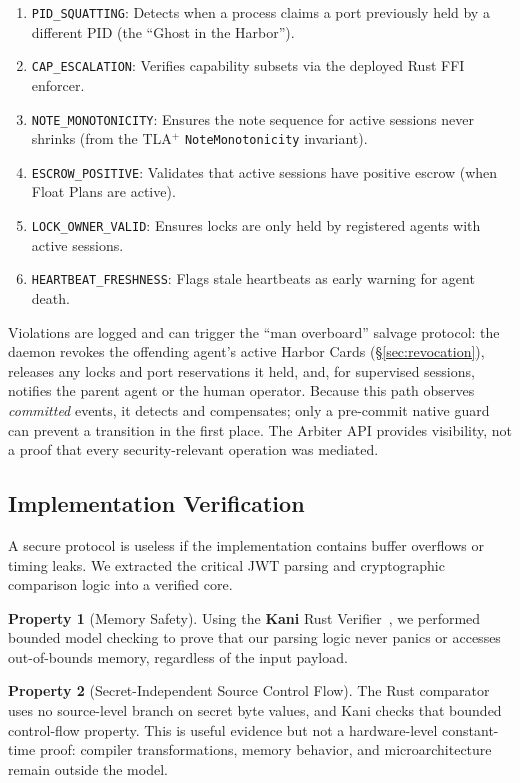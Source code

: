 \documentclass[11pt,a4paper]{article}
\theoremstyle{definition}
\newtheorem{property}{Property}[section]
\begin{document}
\begin{enumerate}
  \item \texttt{PID\_SQUATTING}: Detects when a process claims a port previously held by a different PID (the ``Ghost in the Harbor'').
  \item \texttt{CAP\_ESCALATION}: Verifies capability subsets via the deployed Rust FFI enforcer.
  \item \texttt{NOTE\_MONOTONICITY}: Ensures the note sequence for active sessions never shrinks (from the TLA$^{+}$ \texttt{NoteMonotonicity} invariant).
  \item \texttt{ESCROW\_POSITIVE}: Validates that active sessions have positive escrow (when Float Plans are active).
  \item \texttt{LOCK\_OWNER\_VALID}: Ensures locks are only held by registered agents with active sessions.
  \item \texttt{HEARTBEAT\_FRESHNESS}: Flags stale heartbeats as early warning for agent death.
\end{enumerate}

Violations are logged and can trigger the ``man overboard'' salvage protocol: the daemon revokes the offending agent's active Harbor Cards (\S\ref{sec:revocation}), releases any locks and port reservations it held, and, for supervised sessions, notifies the parent agent or the human operator. Because this path observes \emph{committed} events, it detects and compensates; only a pre-commit native guard can prevent a transition in the first place. The Arbiter API provides visibility, not a proof that every security-relevant operation was mediated.

\subsection{Implementation Verification}

A secure protocol is useless if the implementation contains buffer overflows or timing leaks. We extracted the critical JWT parsing and cryptographic comparison logic into a verified core.

\begin{property}[Memory Safety]
Using the \textbf{Kani} Rust Verifier~\cite{aws2022kani}, we performed bounded model checking to prove that our parsing logic never panics or accesses out-of-bounds memory, regardless of the input payload.
\end{property}

\begin{property}[Secret-Independent Source Control Flow]
The Rust comparator uses no source-level branch on secret byte values, and Kani checks that bounded control-flow property. This is useful evidence but not a hardware-level constant-time proof: compiler transformations, memory behavior, and microarchitecture remain outside the model.
\end{property}
\end{document}
